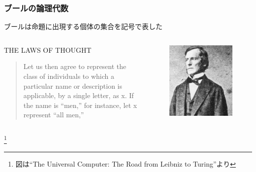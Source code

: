 \documentclass[unicode, 14pt, aspectratio=169]{beamer}
\newcommand\blfootnote[1]{%
  \begingroup
  \renewcommand\thefootnote{}\footnote{#1}%
  \addtocounter{footnote}{-1}%
  \endgroup
}
\begin{document}
\begin{frame}
  \frametitle{ブールの論理代数}
  {\large ブールは命題に出現する個体の集合を記号で表した}
  \begin{columns}
    \begin{column}{0.7\textwidth}
      \begin{center}
        THE LAWS OF THOUGHT\supercite{bool}
        \begin{quotation}
          Let us then agree to represent the class of individuals to which a particular name or description is applicable, by a single letter, as x. If the name is “men,” for instance, let x represent “all men,”
        \end{quotation}
      \end{center}
    \end{column}    
    \begin{column}{0.2\textwidth}
      \begin{figure}
        \includegraphics[width=1\textwidth]{images/bool.png}
      \end{figure}       
    \end{column} 
  \end{columns}
  \blfootnote{図は``The Universal Computer: The Road from Leibniz to Turing''より}
\end{frame}
\end{document}
